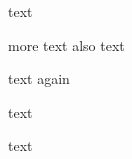 \documentclass{article}
\begin{document}

\begin{AgdaAlign}
text \begin{code}%
\>[0] \AgdaModule{\_} \<%
\end{code} more text
    also text  \begin{code}%
\>[0][@{}l@{\AgdaIndent{1}}]\<[4]%
\>[4]  \AgdaSymbol{:}  \<[23]%
\>[23]\<%
\end{code} text again

 text          \begin{code}%
\>[0][@{}l@{\AgdaIndent{2}}]\<[4]%
\>[4]  \AgdaSymbol{:}  \<[23]%
\>[23]\<%
\end{code}   text             
\end{AgdaAlign}

\begin{code}%
\>[0]\<%
\\
\>[0][@{}l@{\AgdaIndent{0}}]\<[1]%
\>[1] \AgdaSymbol{:} \<%
\end{code}

\begin{code}%
\>[0] \AgdaModule{\_} \<%
\\
\>[0][@{}l@{\AgdaIndent{0}}]\<[1]%
\>[1]\<%
\\
\>[1][@{}l@{\AgdaIndent{0}}]\<[2]%
\>[2] \AgdaSymbol{:} \<%
\end{code}

\begin{code}%
\>[0] \AgdaModule{\_} \<%
\\
\>[0][@{}l@{\AgdaIndent{0}}]\<[9]%
\>[9]\<%
\\
\>[9][@{}l@{\AgdaIndent{0}}]\<[10]%
\>[10] \AgdaSymbol{:} \<%
\end{code}

\begin{AgdaMultiCode}{1}
\begin{code}%
\>[0] \AgdaModule{\_} \<%
\end{code}
\begin{code}%
\>[0][@{}l@{\AgdaIndent{1}}]\<[2]%
\>[2]  \AgdaSymbol{:} \<%
\end{code}
\end{AgdaMultiCode}

\begin{AgdaSuppressSpace}{1}
\begin{code}%
\>[0] \AgdaModule{\_} \<%
\end{code}
\begin{code}%
\>[0][@{}l@{\AgdaIndent{1}}]\<[2]%
\>[2]  \AgdaSymbol{:} \<%
\end{code}
\end{AgdaSuppressSpace}
\end{document}
